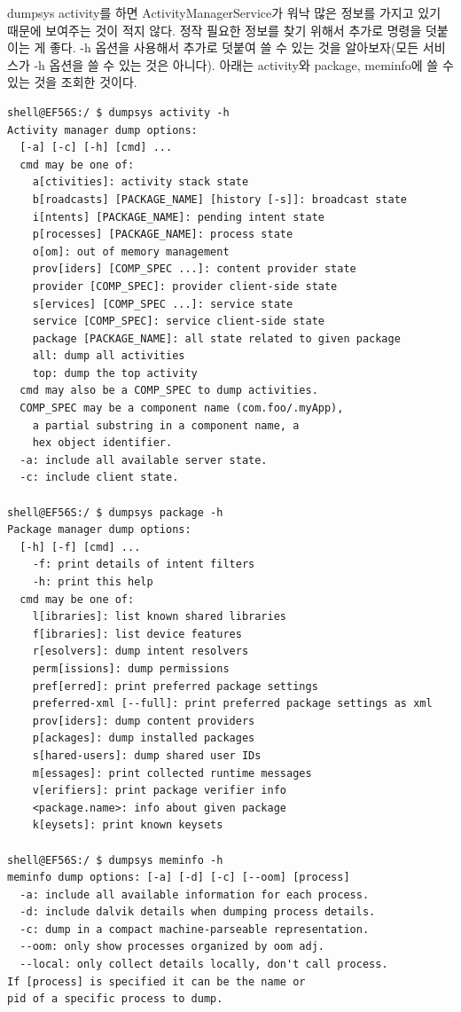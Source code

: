 dumpsys activity를 하면 ActivityManagerService가 워낙 많은 정보를 가지고 있기 때문에 보여주는 것이 적지 않다.
정작 필요한 정보를 찾기 위해서 추가로 명령을 덧붙이는 게 좋다. -h 옵션을 사용해서 추가로 덧붙여 쓸 수 있는 것을 알아보자(모든 서비스가 -h 옵션을 쓸 수 있는 것은 아니다).
아래는 activity와 package, meminfo에 쓸 수 있는 것을 조회한 것이다.
\begin{lstlisting}[frame=single]
shell@EF56S:/ $ dumpsys activity -h 
Activity manager dump options:
  [-a] [-c] [-h] [cmd] ...
  cmd may be one of:
    a[ctivities]: activity stack state
    b[roadcasts] [PACKAGE_NAME] [history [-s]]: broadcast state
    i[ntents] [PACKAGE_NAME]: pending intent state
    p[rocesses] [PACKAGE_NAME]: process state
    o[om]: out of memory management
    prov[iders] [COMP_SPEC ...]: content provider state
    provider [COMP_SPEC]: provider client-side state
    s[ervices] [COMP_SPEC ...]: service state
    service [COMP_SPEC]: service client-side state
    package [PACKAGE_NAME]: all state related to given package
    all: dump all activities
    top: dump the top activity
  cmd may also be a COMP_SPEC to dump activities.
  COMP_SPEC may be a component name (com.foo/.myApp),
    a partial substring in a component name, a
    hex object identifier.
  -a: include all available server state.
  -c: include client state.
  
shell@EF56S:/ $ dumpsys package -h                                             
Package manager dump options:
  [-h] [-f] [cmd] ...
    -f: print details of intent filters
    -h: print this help
  cmd may be one of:
    l[ibraries]: list known shared libraries
    f[ibraries]: list device features
    r[esolvers]: dump intent resolvers
    perm[issions]: dump permissions
    pref[erred]: print preferred package settings
    preferred-xml [--full]: print preferred package settings as xml
    prov[iders]: dump content providers
    p[ackages]: dump installed packages
    s[hared-users]: dump shared user IDs
    m[essages]: print collected runtime messages
    v[erifiers]: print package verifier info
    <package.name>: info about given package
    k[eysets]: print known keysets
    
shell@EF56S:/ $ dumpsys meminfo -h
meminfo dump options: [-a] [-d] [-c] [--oom] [process]
  -a: include all available information for each process.
  -d: include dalvik details when dumping process details.
  -c: dump in a compact machine-parseable representation.
  --oom: only show processes organized by oom adj.
  --local: only collect details locally, don't call process.
If [process] is specified it can be the name or 
pid of a specific process to dump.
\end{lstlisting}


